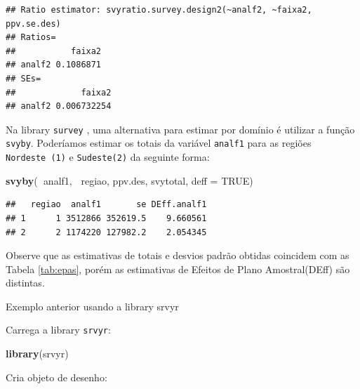 \documentclass[]{book}
\newenvironment{Shaded}{\begin{snugshade}}{\end{snugshade}}
\newcommand{\KeywordTok}[1]{\textcolor[rgb]{0.13,0.29,0.53}{\textbf{#1}}}
\newcommand{\DataTypeTok}[1]{\textcolor[rgb]{0.13,0.29,0.53}{#1}}
\newcommand{\StringTok}[1]{\textcolor[rgb]{0.31,0.60,0.02}{#1}}
\newcommand{\OtherTok}[1]{\textcolor[rgb]{0.56,0.35,0.01}{#1}}
\newcommand{\OperatorTok}[1]{\textcolor[rgb]{0.81,0.36,0.00}{\textbf{#1}}}
\newcommand{\NormalTok}[1]{#1}
\theoremstyle{definition}
\theoremstyle{definition}
\theoremstyle{definition}
\theoremstyle{remark}
\let\BeginKnitrBlock\begin \let\EndKnitrBlock\end
\begin{document}
\begin{verbatim}
## Ratio estimator: svyratio.survey.design2(~analf2, ~faixa2, ppv.se.des)
## Ratios=
##           faixa2
## analf2 0.1086871
## SEs=
##             faixa2
## analf2 0.006732254
\end{verbatim}

Na library \texttt{survey} \citep{R-survey}, uma alternativa para
estimar por domínio é utilizar a função \texttt{svyby}. Poderíamos
estimar os totais da variável \texttt{analf1} para as regiões
\texttt{Nordeste\ (1)} e \texttt{Sudeste(2)} da seguinte forma:

\begin{Shaded}
\begin{Highlighting}[]
\KeywordTok{svyby}\NormalTok{(}\OperatorTok{~}\NormalTok{analf1, }\OperatorTok{~}\NormalTok{regiao, ppv.des, svytotal, }\DataTypeTok{deff =} \OtherTok{TRUE}\NormalTok{)}
\end{Highlighting}
\end{Shaded}

\begin{verbatim}
##   regiao  analf1       se DEff.analf1
## 1      1 3512866 352619.5    9.660561
## 2      2 1174220 127982.2    2.054345
\end{verbatim}

Observe que as estimativas de totais e desvios padrão obtidas coincidem
com as Tabela \ref{tab:epas}, porém as estimativas de Efeitos de Plano
Amostral(DEff) são distintas.

\BeginKnitrBlock{example}
\protect\hypertarget{exm:exe13}{}{\label{exm:exe13} }Exemplo anterior usando
a library srvyr
\EndKnitrBlock{example}

Carrega a library \texttt{srvyr}:

\begin{Shaded}
\begin{Highlighting}[]
\KeywordTok{library}\NormalTok{(srvyr)}
\end{Highlighting}
\end{Shaded}

Cria objeto de desenho:

\begin{Shaded}
\end{Shaded}
\end{document}
